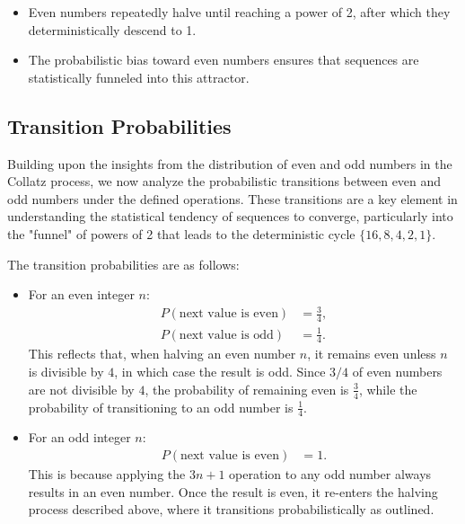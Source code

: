 \begin{itemize}
    \begin{itemize}
        \item Even numbers repeatedly halve until reaching a power of 2, after which they deterministically descend to 1.
        \item The probabilistic bias toward even numbers ensures that sequences are statistically funneled into this attractor.
    \end{itemize}
\end{itemize}


\subsection{Transition Probabilities}
Building upon the insights from the distribution of even and odd numbers in the Collatz process, we now analyze the probabilistic transitions between even and odd numbers under the defined operations. These transitions are a key element in understanding the statistical tendency of sequences to converge, particularly into the "funnel" of powers of 2 that leads to the deterministic cycle \( \{16, 8, 4, 2, 1\} \).

The transition probabilities are as follows:
\begin{itemize}
    \item For an even integer \( n \):
    \begin{align*}
        P(\text{next value is even}) &= \frac{3}{4}, \\
        P(\text{next value is odd}) &= \frac{1}{4}.
    \end{align*}
    This reflects that, when halving an even number \( n \), it remains even unless \( n \) is divisible by \( 4 \), in which case the result is odd. Since \( 3/4 \) of even numbers are not divisible by \( 4 \), the probability of remaining even is \( \frac{3}{4} \), while the probability of transitioning to an odd number is \( \frac{1}{4} \).

    \item For an odd integer \( n \):
    \begin{align*}
        P(\text{next value is even}) &= 1.
    \end{align*}
    This is because applying the \( 3n + 1 \) operation to any odd number always results in an even number. Once the result is even, it re-enters the halving process described above, where it transitions probabilistically as outlined.
\end{itemize}

